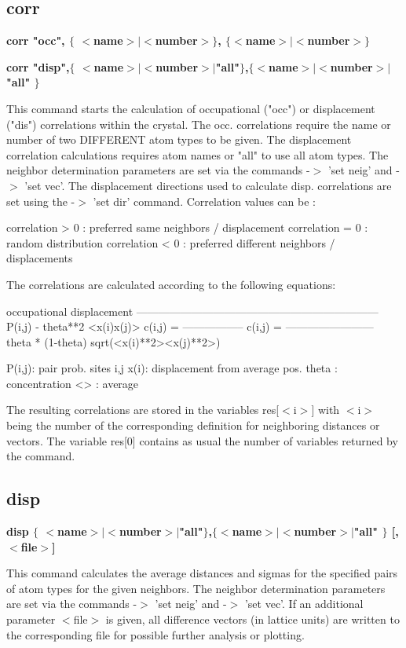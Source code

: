 \subsection*{corr}
{\bf corr "occ", $ \{$ $ <$name$> $$| $$ <$number$> $$\} $, $ \{$$ <$name$> $$| $$ <$number$> $$\} $ \par }
{\bf corr "disp",$ \{$ $ <$name$> $$| $$ <$number$> $$| $"all"$\} $,$ \{$$ <$name$> $$| $$ <$number$> $$| $"all" $\} $ \par }
\par
\vspace{3pt}
This command starts the calculation of occupational ("occ") or 
displacement ("dis") correlations within the crystal. The occ. 
correlations require the name or number of two DIFFERENT atom 
types to be given. The displacement correlation calculations 
requires atom names or "all" to use all atom types. The neighbor 
determination parameters are set via the commands -$> $ 'set neig' and 
-$> $ 'set vec'. The displacement directions used to calculate disp. 
correlations are set using the -$> $ 'set dir' command.  Correlation 
values can be : 
\par
\begin{MacVerbatim}
correlation > 0 : preferred same neighbors / displacement
correlation = 0 : random distribution
correlation < 0 : preferred different neighbors / displacements
\end{MacVerbatim}
The correlations are calculated according to the following 
equations: 
\par
\begin{MacVerbatim}
          occupational                         displacement
------------------------------------------------------------------
          P(i,j) - theta**2                     <x(i)x(j)>
 c(i,j) = -----------------     c(i,j) = ------------------------
          theta * (1-theta)              sqrt(<x(i)**2><x(j)**2>)

 P(i,j): pair prob. sites i,j   x(i): displacement from average pos.
 theta : concentration          <>  : average

\end{MacVerbatim}
The resulting correlations are stored in the variables res[$ <$i$> $] 
with $ <$i$> $ being the number of the corresponding definition for 
neighboring distances or vectors. The variable res[0] contains as 
usual the number of variables returned by the command. 
\subsection*{disp}
{\bf disp $ \{$ $ <$name$> $$| $$ <$number$> $$| $"all"$\} $,$ \{$$ <$name$> $$| $$ <$number$> $$| $"all" $\} $ [,$ <$file$> $] \par }
\par
\vspace{3pt}
This command calculates the average distances and sigmas for the 
specified pairs of atom types for the given neighbors. The neighbor 
determination parameters are set via the commands -$> $ 'set neig' and 
-$> $ 'set vec'. If an additional parameter $ <$file$> $ is given, all difference 
vectors (in lattice units) are written to the corresponding file 
for possible further analysis or plotting. 
